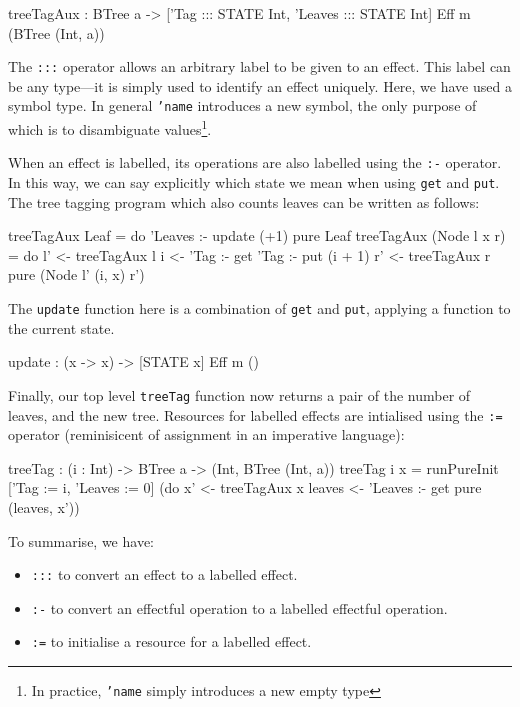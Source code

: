 \begin{code}
treeTagAux : BTree a -> { ['Tag ::: STATE Int,
                           'Leaves ::: STATE Int] } Eff m (BTree (Int, a))
\end{code}

\noindent
The \texttt{:::} operator allows an arbitrary label to be given to an effect.
This label can be any type---it is simply used to identify an effect uniquely.
Here, we have used a symbol type. In general \texttt{'name} introduces a
new symbol, the only purpose of which is to disambiguate values\footnote{In
practice, \texttt{'name} simply introduces a new empty type}. 

When an effect is labelled, its operations are also labelled using the
\texttt{:-} operator. In this way, we can say explicitly which state we mean
when using \texttt{get} and \texttt{put}. The tree tagging program which also
counts leaves can be written as follows:

\begin{code}
treeTagAux Leaf = do 'Leaves :- update (+1)
                     pure Leaf
treeTagAux (Node l x r)
  = do l' <- treeTagAux l
       i <- 'Tag :- get
       'Tag :- put (i + 1)
       r' <- treeTagAux r
       pure (Node l' (i, x) r')
\end{code}

\noindent
The \texttt{update} function here is a combination of \texttt{get} and \texttt{put},
applying a function to the current state.

\begin{code}
update : (x -> x) -> { [STATE x] } Eff m () 
\end{code}

\noindent
Finally, our top level \texttt{treeTag} function now returns a pair of
the number of leaves, and the new tree. Resources for labelled effects are
intialised using the \texttt{:=} operator (reminisicent of assignment in
an imperative language):

\begin{code}
treeTag : (i : Int) -> BTree a -> (Int, BTree (Int, a))
treeTag i x = runPureInit ['Tag := i, 'Leaves := 0]
                    (do x' <- treeTagAux x
                        leaves <- 'Leaves :- get
                        pure (leaves, x'))
\end{code}

\noindent
To summarise, we have:

\begin{itemize}
\item \texttt{:::} to convert an effect to a labelled effect.
\item \texttt{:-} to convert an effectful operation to a labelled effectful operation.
\item \texttt{:=} to initialise a resource for a labelled effect.
\end{itemize}

